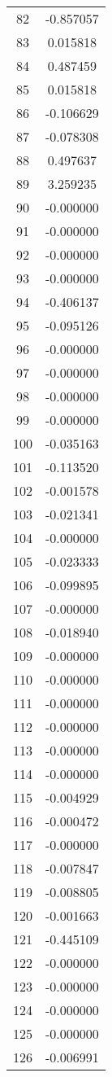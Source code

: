 \documentclass[12pt]{article}
\begin{document}
\begin{longtable}{@{}cc@{}}
82 & -0.857057 \\
83 & 0.015818 \\
84 & 0.487459 \\
85 & 0.015818 \\
86 & -0.106629 \\
87 & -0.078308 \\
88 & 0.497637 \\
89 & 3.259235 \\
90 & -0.000000 \\
91 & -0.000000 \\
92 & -0.000000 \\
93 & -0.000000 \\
94 & -0.406137 \\
95 & -0.095126 \\
96 & -0.000000 \\
97 & -0.000000 \\
98 & -0.000000 \\
99 & -0.000000 \\
100 & -0.035163 \\
101 & -0.113520 \\
102 & -0.001578 \\
103 & -0.021341 \\
104 & -0.000000 \\
105 & -0.023333 \\
106 & -0.099895 \\
107 & -0.000000 \\
108 & -0.018940 \\
109 & -0.000000 \\
110 & -0.000000 \\
111 & -0.000000 \\
112 & -0.000000 \\
113 & -0.000000 \\
114 & -0.000000 \\
115 & -0.004929 \\
116 & -0.000472 \\
117 & -0.000000 \\
118 & -0.007847 \\
119 & -0.008805 \\
120 & -0.001663 \\
121 & -0.445109 \\
122 & -0.000000 \\
123 & -0.000000 \\
124 & -0.000000 \\
125 & -0.000000 \\
126 & -0.006991 \\

\end{longtable}
\end{document}
